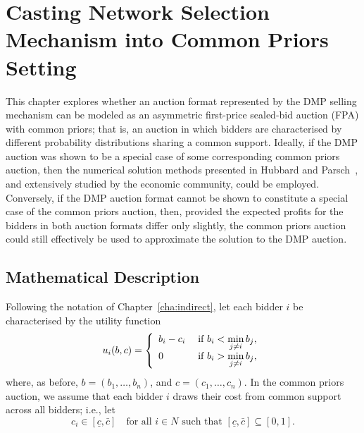 \chapter{Casting Network Selection Mechanism into Common Priors Setting}
\label{cha:approximation}

\minitoc
\vspace{10mm}

This chapter explores whether an auction format represented by the DMP selling mechanism can be modeled as an asymmetric first-price sealed-bid auction (FPA) with common priors; that is, an auction in which bidders are characterised by different probability distributions sharing a common support. Ideally, if the DMP auction was shown to be a special case of some corresponding common priors auction, then the numerical solution methods presented in Hubbard and Parsch~\cite{HubbardPaarsch2011}, and extensively studied by the economic community, could be employed. Conversely, if the DMP auction format cannot be shown to constitute a special case of the common priors auction, then, provided the expected profits for the bidders in both auction formats differ only slightly, the common priors auction could still effectively be used to approximate the solution to the DMP auction.

\section{Mathematical Description} %
\label{sec:mathematical_description_approximation}

Following the notation of Chapter~\ref{cha:indirect}, let each bidder $i$ be characterised by the utility function
\begin{equation}
  \label{eq:utility_approximation}
    u_i(b,c) = \left\{
  \begin{array}{l l}
    b_i-c_i & \;\text{if } b_i < \displaystyle\min_{j\neq i}b_j,\\
    0 & \;\text{if } b_i > \displaystyle\min_{j\neq i}b_j,
  \end{array}\right.
\end{equation}
where, as before, $b = (b_1,\ldots,b_n)$, and $c = (c_1,\ldots,c_n)$. In the common priors auction, we assume that each bidder $i$ draws their cost from common support across all bidders; i.e., let
\begin{equation*}
  c_i\in [\underline{c}, \bar{c}] \quad\text{for all } i\in N \text{ such that } [\underline{c}, \bar{c}]\subseteq [0, 1].
\end{equation*}

